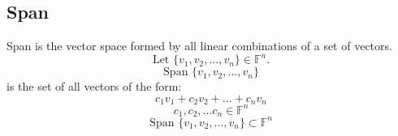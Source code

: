 \documentclass[12pt,a4paper]{article}
\begin{document}
\subsection{Span}
Span is the vector space formed by all linear combinations of a set of vectors.
\[
  \text{Let } \{v_1,v_2,...,v_n\} \in \mathbb{F}^n.
\]
\[
  \text{Span } \{v_1,v_2,...,v_n\}
\]
is the set of all vectors of the form:
\[
  c_1v_1+c_2v_2+...+c_nv_n
\]
\[
  c_1,c_2,...c_n \in \mathbb{F}^n
\]
\[
  \text{Span }\{v_1,v_2,...,v_n\} \subset \mathbb{F}^n
\]
\end{document}
